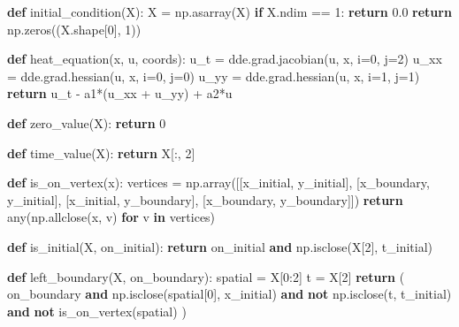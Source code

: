 \documentclass[
  spanish,
  us-letterpaper,
]{scrreprt}
\newenvironment{Shaded}{\begin{snugshade}}{\end{snugshade}}
\newcommand{\BuiltInTok}[1]{\textcolor[rgb]{0.00,0.23,0.31}{#1}}
\newcommand{\ControlFlowTok}[1]{\textcolor[rgb]{0.00,0.23,0.31}{\textbf{#1}}}
\newcommand{\DecValTok}[1]{\textcolor[rgb]{0.68,0.00,0.00}{#1}}
\newcommand{\FloatTok}[1]{\textcolor[rgb]{0.68,0.00,0.00}{#1}}
\newcommand{\KeywordTok}[1]{\textcolor[rgb]{0.00,0.23,0.31}{\textbf{#1}}}
\newcommand{\NormalTok}[1]{\textcolor[rgb]{0.00,0.23,0.31}{#1}}
\newcommand{\OperatorTok}[1]{\textcolor[rgb]{0.37,0.37,0.37}{#1}}
\theoremstyle{definition}
\theoremstyle{plain}
\theoremstyle{remark}
\begin{document}
\begin{Shaded}
\begin{Highlighting}[]
\KeywordTok{def}\NormalTok{ initial\_condition(X):}
\NormalTok{    X }\OperatorTok{=}\NormalTok{ np.asarray(X)}
    \ControlFlowTok{if}\NormalTok{ X.ndim }\OperatorTok{==} \DecValTok{1}\NormalTok{:}
        \ControlFlowTok{return} \FloatTok{0.0}
    \ControlFlowTok{return}\NormalTok{ np.zeros((X.shape[}\DecValTok{0}\NormalTok{], }\DecValTok{1}\NormalTok{))}

\KeywordTok{def}\NormalTok{ heat\_equation(x, u, coords):}
\NormalTok{    u\_t }\OperatorTok{=}\NormalTok{ dde.grad.jacobian(u, x, i}\OperatorTok{=}\DecValTok{0}\NormalTok{, j}\OperatorTok{=}\DecValTok{2}\NormalTok{)}
\NormalTok{    u\_xx }\OperatorTok{=}\NormalTok{ dde.grad.hessian(u, x, i}\OperatorTok{=}\DecValTok{0}\NormalTok{, j}\OperatorTok{=}\DecValTok{0}\NormalTok{)}
\NormalTok{    u\_yy }\OperatorTok{=}\NormalTok{ dde.grad.hessian(u, x, i}\OperatorTok{=}\DecValTok{1}\NormalTok{, j}\OperatorTok{=}\DecValTok{1}\NormalTok{)}
    \ControlFlowTok{return}\NormalTok{ u\_t }\OperatorTok{{-}}\NormalTok{ a1}\OperatorTok{*}\NormalTok{(u\_xx }\OperatorTok{+}\NormalTok{ u\_yy) }\OperatorTok{+}\NormalTok{ a2}\OperatorTok{*}\NormalTok{u}

\KeywordTok{def}\NormalTok{ zero\_value(X):}
    \ControlFlowTok{return} \DecValTok{0}

\KeywordTok{def}\NormalTok{ time\_value(X):}
    \ControlFlowTok{return}\NormalTok{ X[:, }\DecValTok{2}\NormalTok{]}

\KeywordTok{def}\NormalTok{ is\_on\_vertex(x):}
\NormalTok{    vertices }\OperatorTok{=}\NormalTok{ np.array([[x\_initial, y\_initial],}
\NormalTok{                         [x\_boundary, y\_initial],}
\NormalTok{                         [x\_initial, y\_boundary],}
\NormalTok{                         [x\_boundary, y\_boundary]])}
    \ControlFlowTok{return} \BuiltInTok{any}\NormalTok{(np.allclose(x, v) }\ControlFlowTok{for}\NormalTok{ v }\KeywordTok{in}\NormalTok{ vertices)}

\KeywordTok{def}\NormalTok{ is\_initial(X, on\_initial):}
    \ControlFlowTok{return}\NormalTok{ on\_initial }\KeywordTok{and}\NormalTok{ np.isclose(X[}\DecValTok{2}\NormalTok{], t\_initial)}

\KeywordTok{def}\NormalTok{ left\_boundary(X, on\_boundary):}
\NormalTok{    spatial }\OperatorTok{=}\NormalTok{ X[}\DecValTok{0}\NormalTok{:}\DecValTok{2}\NormalTok{]}
\NormalTok{    t }\OperatorTok{=}\NormalTok{ X[}\DecValTok{2}\NormalTok{]}
    \ControlFlowTok{return}\NormalTok{ (}
\NormalTok{        on\_boundary }
        \KeywordTok{and}\NormalTok{ np.isclose(spatial[}\DecValTok{0}\NormalTok{], x\_initial) }
        \KeywordTok{and} \KeywordTok{not}\NormalTok{ np.isclose(t, t\_initial) }
        \KeywordTok{and} \KeywordTok{not}\NormalTok{ is\_on\_vertex(spatial)}
\NormalTok{    )}


\end{Highlighting}
\end{Shaded}
\end{document}

